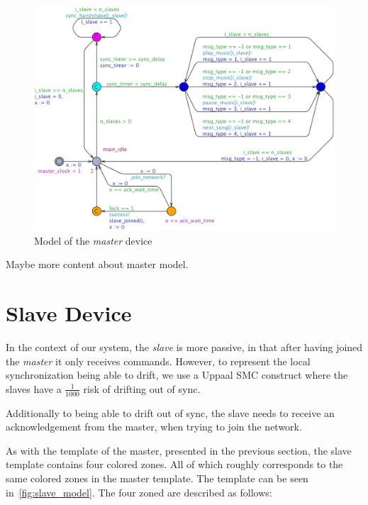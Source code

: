 \begin{figure}[htb]
    \centering
    \includegraphics[width=1\textwidth]{master_model.pdf}
    \caption{Model of the \textit{master} device}\label{fig:master_model}
\end{figure}

Maybe more content about master model.

\section{Slave Device}

In the context of our system, the \textit{slave} is more passive, in that after having joined the \textit{master} it only receives commands.
However, to represent the local synchronization being able to drift, we use a Uppaal SMC construct where the slaves have a $\frac{1}{1000}$ risk of drifting out of sync.

Additionally to being able to drift out of sync, the slave needs to receive an acknowledgement from the master, when trying to join the network.

\bigskip
As with the template of the master, presented in the previous section, the slave template contains four colored zones.
All of which roughly corresponds to the same colored zones in the master template.
The template can be seen in~\cref{fig:slave_model}.
The four zoned are described as follows:

